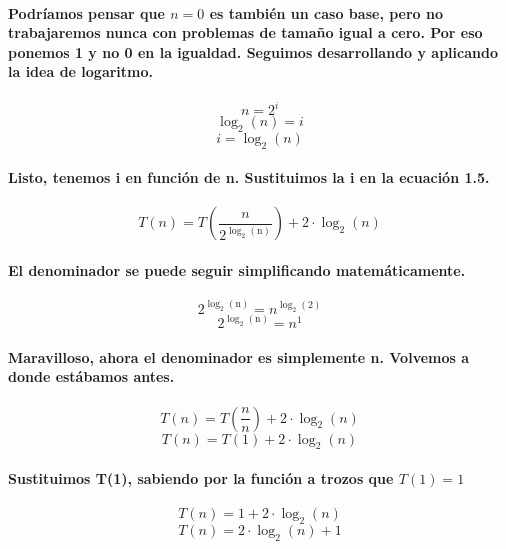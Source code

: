 \documentclass{book}
\begin{document}
	\paragraph{Podríamos pensar que $n=0$ es también un caso base, pero no trabajaremos nunca con problemas de tamaño igual a cero. Por eso ponemos 1 y no 0 en la igualdad. Seguimos desarrollando y aplicando la idea de logaritmo.}
	\begin{equation}
	   	n = 2^i \nonumber 
	\end{equation}
	\begin{equation}
		\log_{2}(n) = i \nonumber 
	\end{equation}
	\begin{equation}
	   	i = \log_{2}(n) \nonumber 
	\end{equation}
	\paragraph{Listo, tenemos i en función de n. Sustituimos la i en la ecuación 1.5.}
	\begin{equation}
		T(n) = T(\frac{n}{2^\mathrm{\log_{2}(n)}}) + 2 \cdot \log_{2}(n)  \nonumber 
	\end{equation}
	\paragraph{El denominador se puede seguir simplificando matemáticamente.}
	\begin{equation}
		2^\mathrm{\log_{2}(n)} = n^\mathrm{\log_{2}(2)} \nonumber 
	\end{equation}
	\begin{equation}
		2^\mathrm{\log_{2}(n)} = n^1 \nonumber 
	\end{equation}
	\paragraph{Maravilloso, ahora el denominador es simplemente n. Volvemos a donde estábamos antes.}
	\begin{equation}
		T(n) = T(\frac{n}{n}) + 2 \cdot \log_{2}(n) \nonumber 
	\end{equation}
	\begin{equation}
		T(n) = T(1) + 2 \cdot \log_{2}(n) \nonumber 
	\end{equation}
	\paragraph{Sustituimos T(1), sabiendo por la función a trozos que $T(1) = 1$}
	\begin{equation}
		T(n) = 1 + 2 \cdot \log_{2}(n) \nonumber 
	\end{equation}
	\begin{equation}
		T(n) = 2 \cdot \log_{2}(n) + 1 
	\end{equation}
\end{document}
